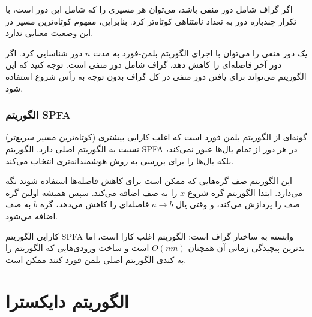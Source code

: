 اگر گراف شامل دور منفی باشد،
می‌توان هر مسیری را که شامل این دور است،
با تکرار چندباره دور به تعداد نامتناهی کوتاه‌تر کرد.
بنابراین، مفهوم کوتاه‌ترین مسیر در این وضعیت معنایی ندارد.

یک دور منفی را می‌توان با اجرای الگوریتم بلمن-فورد
به مدت $n$ دور شناسایی کرد.
اگر دور آخر فاصله‌ای را کاهش دهد،
گراف شامل دور منفی است.
توجه کنید که این الگوریتم می‌تواند برای
یافتن دور منفی در کل گراف بدون توجه به رأس شروع استفاده شود.

\subsubsection{الگوریتم SPFA}


 (کوتاه‌ترین مسیر سریع‌تر) \cite{fan94}
گونه‌ای از الگوریتم بلمن-فورد است
که اغلب کارایی بیشتری نسبت به الگوریتم اصلی دارد.
الگوریتم SPFA در هر دور از تمام یال‌ها عبور نمی‌کند،
بلکه یال‌ها را برای بررسی به روش هوشمندانه‌تری انتخاب می‌کند.

این الگوریتم صف گره‌هایی که ممکن است برای کاهش فاصله‌ها استفاده شوند نگه می‌دارد.
ابتدا الگوریتم گره شروع $x$ را به صف اضافه می‌کند.
سپس همیشه اولین گره صف را پردازش می‌کند، و وقتی یال $a \rightarrow b$ فاصله‌ای را کاهش می‌دهد،
گره $b$ به صف اضافه می‌شود.
% 
% 

کارایی الگوریتم SPFA وابسته به ساختار گراف است:
الگوریتم اغلب کارا است،
اما بدترین پیچیدگی زمانی آن همچنان $O(nm)$ است و ساخت ورودی‌هایی که الگوریتم را به کندی الگوریتم اصلی بلمن-فورد کنند ممکن است.

\section{الگوریتم دایکسترا}

